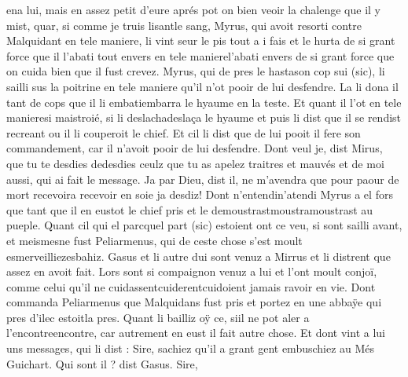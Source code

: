 \documentclass{article}
\begin{document}
\begin{pages}
                  ena lui, mais en assez petit d’eure aprés pot on bien veoir la chalenge que il y
               mist, quar, si comme je truis 
                     lisantle sang, Myrus, qui avoit resorti contre
                  Malquidant en tele maniere, li vint seur le
               pis tout a i fais et 
                  le hurta de si grant force que il l’abati tout envers en
                     tele manierel'abati envers de si grant force que on cuida bien que il fust crevez. Myrus,
               qui 
                  de pres le hastason cop sui (sic), li sailli sus la poitrine en tele maniere qu’il n’ot pooir de
               lui desfendre. La li dona il tant de cops que il li 
                  embatiembarra le hyaume en la teste. Et quant il l’ot 
                  en tele manieresi maistroié, si li 
                  deslachadeslaça le hyaume et puis li dist que il se rendist
                  recreant ou il li couperoit le chief. Et cil 
                  li dist que de lui pooit il fere son
                  commandement, car il n’avoit pooir de lui desfendre. Dont veul je, dist Mirus, que tu 
                     te desdies dedesdies ceulz que tu as apelez traitres et mauvés et 
                     de moi aussi, qui ai fait le message.
               Ja par Dieu, dist il, ne m’avendra que pour paour de
                  mort 
                     recevoira recevoir en soie ja desdiz! Dont 
                  n’entendin'atendi
               Myrus a el fors que tant que il en 
                  eustot le chief pris et le 
                  demoustrastmoustramoustrast au pueple. \pend
            \pstart Quant cil 
                  qui el parcquel part (sic) estoient ont ce veu, si sont sailli avant, 
                  et meismesne fust
               Peliarmenus, qui de ceste chose s’est moult 
                  esmerveilliezesbahiz. Gasus et li autre dui sont venuz a Mirrus et li distrent que assez en avoit fait. Lors sont si compaignon venuz a lui et
               l’ont moult conjoï, comme celui qu’il ne 
                  cuidassentcuiderentcuidoient jamais ravoir en vie. Dont commanda Peliarmenus que Malquidans fust
               pris et portez en une abbaÿe 
                  qui pres d’ilec estoitla pres. Quant li bailliz oÿ ce, 
                  siil ne pot aler 
                  a l’encontreencontre, car autrement en eust il fait autre chose. Et dont vint a lui uns messages,
               qui li dist : Sire, sachiez qu’il a grant gent
                  embuschiez au Més Guichart.
               Qui sont il ? dist Gasus.
               Sire, 
                     

\end{pages}
\end{document}
